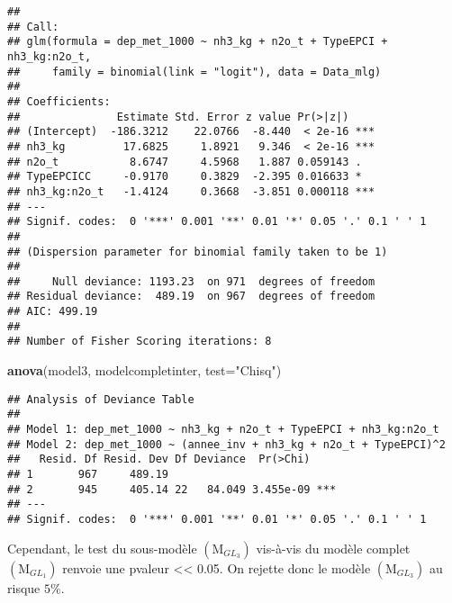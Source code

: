 \documentclass[
]{article}
\newenvironment{Shaded}{\begin{snugshade}}{\end{snugshade}}
\newcommand{\AttributeTok}[1]{\textcolor[rgb]{0.13,0.29,0.53}{#1}}
\newcommand{\FunctionTok}[1]{\textcolor[rgb]{0.13,0.29,0.53}{\textbf{#1}}}
\newcommand{\NormalTok}[1]{#1}
\newcommand{\StringTok}[1]{\textcolor[rgb]{0.31,0.60,0.02}{#1}}
\begin{document}
\begin{verbatim}
## 
## Call:
## glm(formula = dep_met_1000 ~ nh3_kg + n2o_t + TypeEPCI + nh3_kg:n2o_t, 
##     family = binomial(link = "logit"), data = Data_mlg)
## 
## Coefficients:
##               Estimate Std. Error z value Pr(>|z|)    
## (Intercept)  -186.3212    22.0766  -8.440  < 2e-16 ***
## nh3_kg         17.6825     1.8921   9.346  < 2e-16 ***
## n2o_t           8.6747     4.5968   1.887 0.059143 .  
## TypeEPCICC     -0.9170     0.3829  -2.395 0.016633 *  
## nh3_kg:n2o_t   -1.4124     0.3668  -3.851 0.000118 ***
## ---
## Signif. codes:  0 '***' 0.001 '**' 0.01 '*' 0.05 '.' 0.1 ' ' 1
## 
## (Dispersion parameter for binomial family taken to be 1)
## 
##     Null deviance: 1193.23  on 971  degrees of freedom
## Residual deviance:  489.19  on 967  degrees of freedom
## AIC: 499.19
## 
## Number of Fisher Scoring iterations: 8
\end{verbatim}

\begin{Shaded}
\begin{Highlighting}[]
\FunctionTok{anova}\NormalTok{(model3, modelcompletinter, }\AttributeTok{test=}\StringTok{"Chisq"}\NormalTok{)}
\end{Highlighting}
\end{Shaded}

\begin{verbatim}
## Analysis of Deviance Table
## 
## Model 1: dep_met_1000 ~ nh3_kg + n2o_t + TypeEPCI + nh3_kg:n2o_t
## Model 2: dep_met_1000 ~ (annee_inv + nh3_kg + n2o_t + TypeEPCI)^2
##   Resid. Df Resid. Dev Df Deviance  Pr(>Chi)    
## 1       967     489.19                          
## 2       945     405.14 22   84.049 3.455e-09 ***
## ---
## Signif. codes:  0 '***' 0.001 '**' 0.01 '*' 0.05 '.' 0.1 ' ' 1
\end{verbatim}

Cependant, le test du sous-modèle \((\text{M}_{GL_{3}})\) vis-à-vis du
modèle complet \((\text{M}_{GL_{1}})\) renvoie une pvaleur
\textless\textless{} 0.05. On rejette donc le modèle
\((\text{M}_{GL_{3}})\) au risque \(5\%\).
\end{document}
